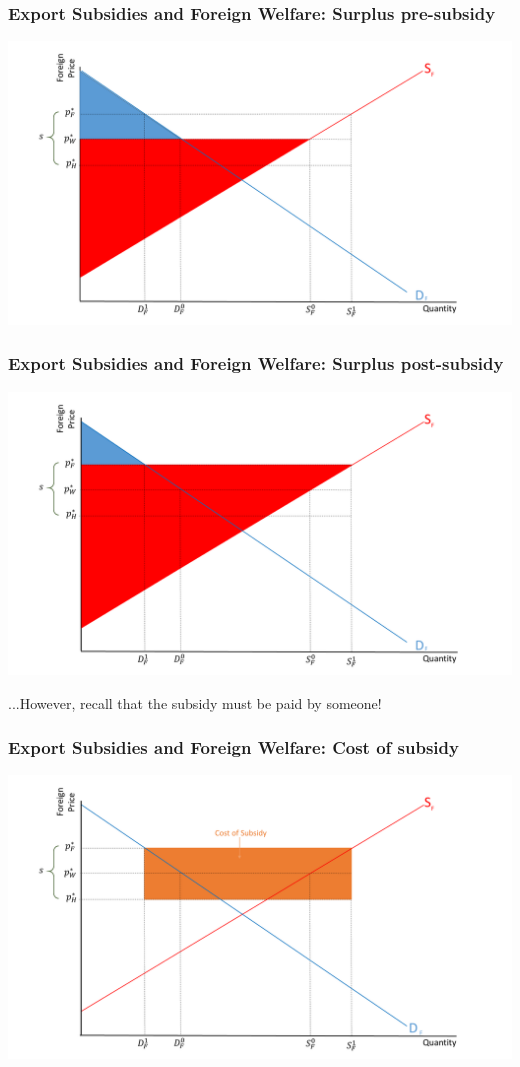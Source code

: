 \documentclass{beamer}
\begin{document}
\begin{frame}
	\frametitle{Export Subsidies and Foreign Welfare: Surplus pre-subsidy}
	
	\includegraphics[scale=0.3]{SL_24.pdf}
	
\end{frame}

\begin{frame}
	\frametitle{Export Subsidies and Foreign Welfare: Surplus post-subsidy}
	
	\includegraphics[scale=0.3]{SL_25.pdf}
	
	
	...However, recall that the subsidy must be paid by someone!
	
\end{frame}

\begin{frame}
	\frametitle{Export Subsidies and Foreign Welfare:  Cost of subsidy}
	
	\includegraphics[scale=0.3]{SL_26.pdf}
	
\end{frame}
\end{document}
